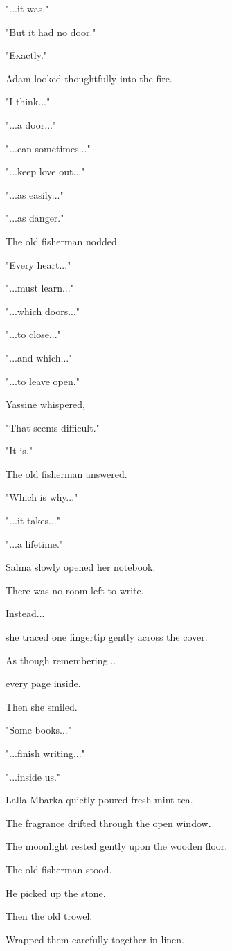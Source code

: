 \documentclass[12pt,openany]{book}
\begin{document}
"...it was."

"But it had no door."

"Exactly."

Adam looked thoughtfully into the fire.

"I think..."

"...a door..."

"...can sometimes..."

"...keep love out..."

"...as easily..."

"...as danger."

The old fisherman nodded.

"Every heart..."

"...must learn..."

"...which doors..."

"...to close..."

"...and which..."

"...to leave open."

Yassine whispered,

"That seems difficult."

"It is."

The old fisherman answered.

"Which is why..."

"...it takes..."

"...a lifetime."

Salma slowly opened her notebook.

There was no room left to write.

Instead...

she traced one fingertip gently across the cover.

As though remembering...

every page inside.

Then she smiled.

"Some books..."

"...finish writing..."

"...inside us."

Lalla Mbarka quietly poured fresh mint tea.

The fragrance drifted through the open window.

The moonlight rested gently upon the wooden floor.

The old fisherman stood.

He picked up the stone.

Then the old trowel.

Wrapped them carefully together in linen.
\end{document}
